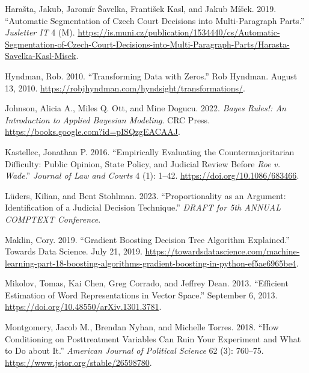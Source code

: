 \documentclass[
  11pt,
]{article}
\newlength{\cslhangindent}
\newenvironment{CSLReferences}[2] %
 {%
  \setlength{\parindent}{0pt}
  \ifodd #1 \everypar{\setlength{\hangindent}{\cslhangindent}}\ignorespaces\fi
  \ifnum #2 > 0
  \setlength{\parskip}{#2\baselineskip}
  \fi
 }%
 {}
\begin{document}
\begin{CSLReferences}{1}{0}
\leavevmode{}%
Harašta, Jakub, Jaromír Šavelka, František Kasl, and Jakub Míšek. 2019.
{``Automatic {Segmentation} of {Czech Court Decisions} into
{Multi-Paragraph Parts}.''} \emph{Jusletter IT} 4 (M).
\url{https://is.muni.cz/publication/1534440/cs/Automatic-Segmentation-of-Czech-Court-Decisions-into-Multi-Paragraph-Parts/Harasta-Savelka-Kasl-Misek}.

\leavevmode{}%
Hyndman, Rob. 2010. {``Transforming Data with Zeros.''} {Rob Hyndman}.
August 13, 2010.
\url{https://robjhyndman.com/hyndsight/transformations/}.

\leavevmode{}%
Johnson, Alicia A., Miles Q. Ott, and Mine Dogucu. 2022. \emph{Bayes
{Rules}!: {An Introduction} to {Applied Bayesian Modeling}}. {CRC
Press}. \url{https://books.google.com?id=pISQzgEACAAJ}.

\leavevmode{}%
Kastellec, Jonathan P. 2016. {``Empirically {Evaluating} the
{Countermajoritarian Difficulty}: {Public Opinion}, {State Policy}, and
{Judicial Review} Before {\emph{Roe}}{ \emph{v.} }{\emph{Wade}}.''}
\emph{Journal of Law and Courts} 4 (1): 1--42.
\url{https://doi.org/10.1086/683466}.

\leavevmode{}%
Lüders, Kilian, and Bent Stohlman. 2023. {``Proportionality as an
Argument: {Identification} of a Judicial Decision Technique.''}
\emph{DRAFT for 5th ANNUAL COMPTEXT Conference}.

\leavevmode{}%
Maklin, Cory. 2019. {``Gradient {Boosting Decision Tree Algorithm
Explained}.''} {Towards Data Science}. July 21, 2019.
\url{https://towardsdatascience.com/machine-learning-part-18-boosting-algorithms-gradient-boosting-in-python-ef5ae6965be4}.

\leavevmode{}%
Mikolov, Tomas, Kai Chen, Greg Corrado, and Jeffrey Dean. 2013.
{``Efficient {Estimation} of {Word Representations} in {Vector
Space}.''} September 6, 2013.
\url{https://doi.org/10.48550/arXiv.1301.3781}.

\leavevmode{}%
Montgomery, Jacob M., Brendan Nyhan, and Michelle Torres. 2018. {``How
{Conditioning} on {Posttreatment Variables Can Ruin Your Experiment} and
{What} to {Do} about {It}.''} \emph{American Journal of Political
Science} 62 (3): 760--75. \url{https://www.jstor.org/stable/26598780}.


\end{CSLReferences}
\end{document}
